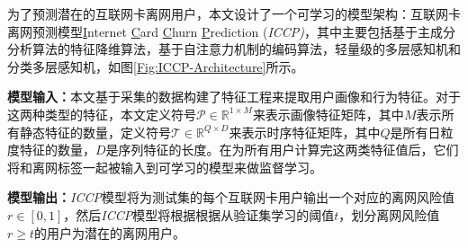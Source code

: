 为了预测潜在的互联网卡离网用户，本文设计了一个可学习的模型架构：互联网卡离网预测模型\underline{I}nternet \underline{C}ard \underline{C}hurn \underline{P}rediction (\emph{ICCP)}，其中主要包括基于主成分分析算法的特征降维算法，基于自注意力机制的编码算法，轻量级的多层感知机和分类多层感知机，如图\ref{Fig:ICCP-Architecture}所示。\par

\textbf{模型输入：}本文基于采集的数据构建了特征工程来提取用户画像和行为特征。对于这两种类型的特征，本文定义符号$\mathcal{P} \in \mathbb{R}^{1 \times M}$来表示画像特征矩阵，其中$M$表示所有静态特征的数量，定义符号$\mathcal{T} \in \mathbb{R}^{Q \times D}$来表示时序特征矩阵，其中$Q$是所有日粒度特征的数量，$D$是序列特征的长度。在为所有用户计算完这两类特征值后，它们将和离网标签一起被输入到可学习的模型来做监督学习。\par

\textbf{模型输出：}\emph{ICCP}模型将为测试集的每个互联网卡用户输出一个对应的离网风险值$r \in [0,1]$，然后\emph{ICCP}模型将根据根据从验证集学习的阈值$t$，划分离网风险值$r \ge t$的用户为潜在的离网用户。

\par

